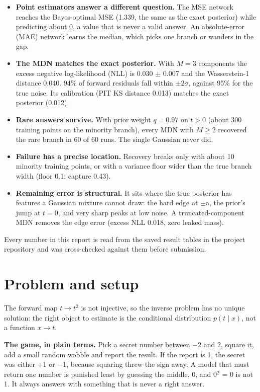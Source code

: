 \documentclass[11pt,a4paper]{article}
\begin{document}
\begin{itemize}
\item \textbf{Point estimators answer a different question.} The MSE network reaches the Bayes-optimal MSE (1.339, the same as the exact posterior) while predicting about 0, a value that is never a valid answer. An absolute-error (MAE) network learns the median, which picks one branch or wanders in the gap.
\item \textbf{The MDN matches the exact posterior.} With $M = 3$ components the excess negative log-likelihood (NLL) is 0.030 $\pm$ 0.007 and the Wasserstein-1 distance 0.040. 94\% of forward residuals fall within $\pm 2\sigma$, against 95\% for the true noise. Its calibration (PIT KS distance 0.013) matches the exact posterior (0.012).
\item \textbf{Rare answers survive.} With prior weight $q = 0.97$ on $t > 0$ (about 300 training points on the minority branch), every MDN with $M \ge  2$ recovered the rare branch in 60 of 60 runs. The single Gaussian never did.
\item \textbf{Failure has a precise location.} Recovery breaks only with about 10 minority training points, or with a variance floor wider than the true branch width (floor 0.1: capture 0.43).
\item \textbf{Remaining error is structural.} It sits where the true posterior has features a Gaussian mixture cannot draw: the hard edge at $\pm$a, the prior's jump at $t = 0$, and very sharp peaks at low noise. A truncated-component MDN removes the edge error (excess NLL 0.018, zero leaked mass).
\end{itemize}

Every number in this report is read from the saved result tables in the project repository and was cross-checked against them before submission.

\section{Problem and setup}
The forward map $t \to  t^{2}$ is not injective, so the inverse problem has no unique solution: the right object to estimate is the conditional distribution $p(t \mid  x)$, not a function $x \to  t$.

\textbf{The game, in plain terms.} Pick a secret number between $-$2 and 2, square it, add a small random wobble and report the result. If the report is 1, the secret was either +1 or $-$1, because squaring threw the sign away. A model that must return one number is punished least by guessing the middle, 0, and 0$^{2}$ = 0 is not 1. It always answers with something that is never a right answer.
\end{document}
